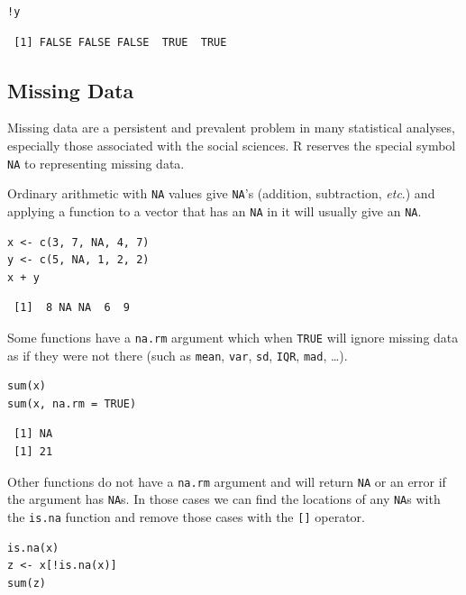 \documentclass[captions=tableheading]{scrbook}
\begin{document}
\begin{verbatim}
!y
\end{verbatim}

\begin{verbatim}
 [1] FALSE FALSE FALSE  TRUE  TRUE
\end{verbatim}
\subsection{Missing Data}
\label{sec-2-1-6}

\label{sub:Missing-Data}

Missing data are a persistent and prevalent problem in many statistical analyses, especially those associated with the social sciences. \textsf{R} reserves the special symbol \texttt{NA} to representing missing data.

Ordinary arithmetic with \texttt{NA} values give \texttt{NA}'s (addition, subtraction, \emph{etc}.) and applying a function to a vector that has an \texttt{NA} in it will usually give an \texttt{NA}.


\begin{verbatim}
x <- c(3, 7, NA, 4, 7)
y <- c(5, NA, 1, 2, 2)
x + y
\end{verbatim}

\begin{verbatim}
 [1]  8 NA NA  6  9
\end{verbatim}

Some functions have a \texttt{na.rm} argument which when \texttt{TRUE} will ignore missing data as if they were not there (such as \texttt{mean}, \texttt{var}, \texttt{sd}, \texttt{IQR}, \texttt{mad}, \ldots{}). 


\begin{verbatim}
sum(x)
sum(x, na.rm = TRUE)
\end{verbatim}

\begin{verbatim}
 [1] NA
 [1] 21
\end{verbatim}

Other functions do not have a \texttt{na.rm} argument and will return \texttt{NA} or an error if the argument has \texttt{NA}s. In those cases we can find the locations of any \texttt{NA}s with the \texttt{is.na} function and remove those cases with the \texttt{[]} operator.


\begin{verbatim}
is.na(x)
z <- x[!is.na(x)]
sum(z)
\end{verbatim}
\end{document}

